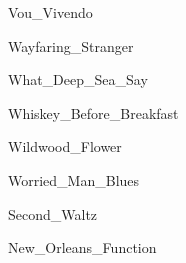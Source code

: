 \documentclass{scrartcl}
\begin{document}

{Vou_Vivendo}


{Wayfaring_Stranger}


{What_Deep_Sea_Say}


{Whiskey_Before_Breakfast}


{Wildwood_Flower}


{Worried_Man_Blues}


{Second_Waltz}


{New_Orleans_Function}
\end{document}
